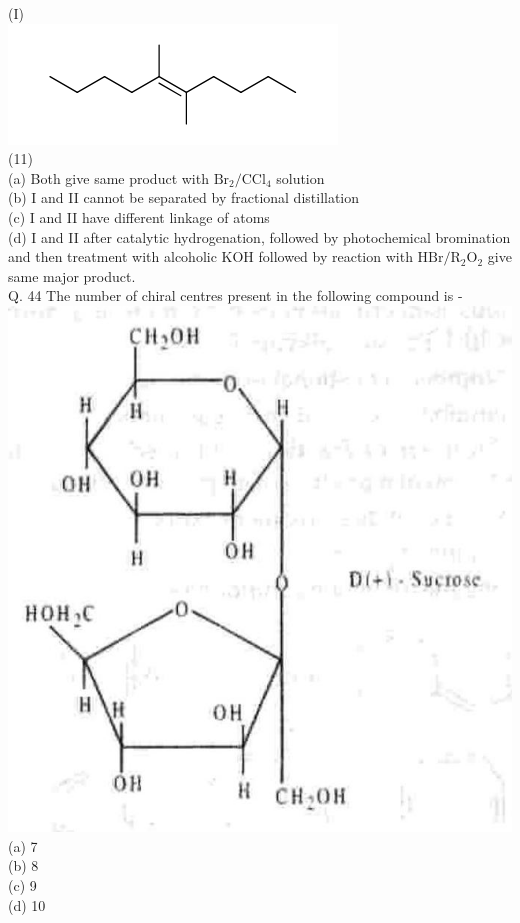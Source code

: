 \documentclass[10pt]{article}
\begin{document}
(I)\\
\includegraphics{smile-36b1fcf113ef15efc15de00dcad0ff3b5a463c47}\\
(11)\\
(a) Both give same product with $\mathrm{Br}_{2} / \mathrm{CCl}_{4}$ solution\\
(b) I and II cannot be separated by fractional distillation\\
(c) I and II have different linkage of atoms\\
(d) I and II after catalytic hydrogenation, followed by photochemical bromination and then treatment with alcoholic KOH followed by reaction with $\mathrm{HBr} / \mathrm{R}_{2} \mathrm{O}_{2}$ give same major product.\\
Q. 44 The number of chiral centres present in the following compound is -\\
\includegraphics[max width=\textwidth, center]{2025_01_28_8470952b98110cec3aabg-151(1)}\\
(a) 7\\
(b) 8\\
(c) 9\\
(d) 10
\end{document}
